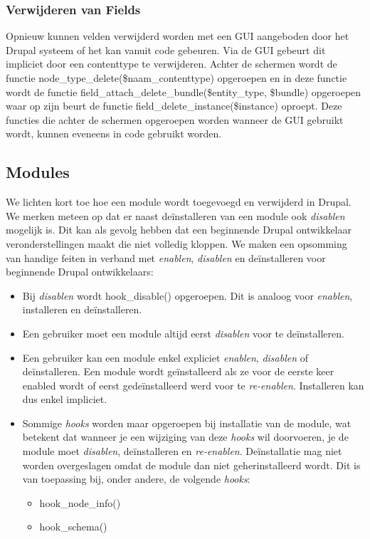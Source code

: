 \subsubsection{Verwijderen van Fields}
Opnieuw kunnen velden verwijderd worden met een GUI aangeboden door het Drupal systeem of het kan vanuit code gebeuren. Via de GUI gebeurt dit impliciet door een contenttype te verwijderen. Achter de schermen wordt de functie node\_type\_delete(\$naam\_contenttype) opgeroepen en in deze functie wordt de functie field\_attach\_delete\_bundle(\$entity\_type, \$bundle) opgeroepen waar op zijn beurt de functie field\_delete\_instance(\$instance) oproept. Deze functies die achter de schermen opgeroepen worden wanneer de GUI gebruikt wordt, kunnen eveneens in code gebruikt worden.
\newpage
\subsection{Modules}
We lichten kort toe hoe een module wordt toegevoegd en verwijderd in Drupal. We merken meteen op dat er naast de\"{i}nstalleren van een module ook \textit{disablen} mogelijk is. Dit kan als gevolg hebben dat een beginnende Drupal ontwikkelaar veronderstellingen maakt die niet volledig kloppen. We maken een opsomming van handige feiten in verband met \textit{enablen}, \textit{disablen} en de\"{i}nstalleren voor beginnende Drupal ontwikkelaars:
\begin{itemize}
\item Bij \textit{disablen} wordt hook\_disable() opgeroepen. Dit is analoog voor \textit{enablen}, installeren en de\"{i}nstalleren.
\item Een gebruiker moet een module altijd eerst \textit{disablen} voor te de\"{i}nstalleren.
\item Een gebruiker kan een module enkel expliciet \textit{enablen}, \textit{disablen} of de\"{i}nstalleren. Een module wordt ge\"{i}nstalleerd als ze voor de eerste keer enabled wordt of eerst gede\"{i}nstalleerd werd voor te \textit{re-enablen}. Installeren kan dus enkel impliciet.
\item Sommige \textit{hooks} worden maar opgeroepen bij installatie van de module, wat betekent dat wanneer je een wijziging van deze \textit{hooks} wil doorvoeren, je de module moet \textit{disablen}, de\"{i}nstalleren en \textit{re-enablen}. De\"{i}nstallatie mag niet worden overgeslagen omdat de module dan niet geherinstalleerd wordt. Dit is van toepassing bij, onder andere, de volgende \textit{hooks}:
\begin{itemize}
\item hook\_node\_info()
\item hook\_schema()
\end{itemize}
\end{itemize}

